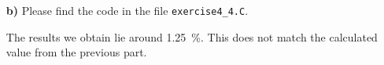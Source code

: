 \documentclass[10pt]{article}
\newenvironment{myfont}{\fontfamily{put}\selectfont}{\par}
\begin{document}
\begin{myfont}
\begin{itemize}
    \noindent This results in

    \begin{equation}
      p = \frac{O_{\textrm{segment}}}{O_{\textrm{sphere}}} = \frac{2\pi \cdot \left(a^{2} + (r-h)^{2}\right) \cdot \left(1 - \frac{1}{\sqrt{\left(\frac{a}{r-h}\right)^{2} + 1}} \right)}{4\pi \cdot r^{2}} = \frac{1}{2} - \frac{1}{2\sqrt{\left(\frac{a}{r-h}\right)^{2} + 1}}
    \end{equation}

    \noindent Using $a =$ \SI{0.02}{\metre} and $r-h =$ \SI{0.10}{\metre} yields $p =$ \SI{0.971}{\percent}.



  \item[\textbf{b)}] Please find the code in the file \texttt{exercise4\_4.C}.

    \noindent The results we obtain lie around \SI{1.25}{\percent}.
    This does not match the calculated value from the previous part.    

\end{itemize}


\end{myfont}
\end{document}
